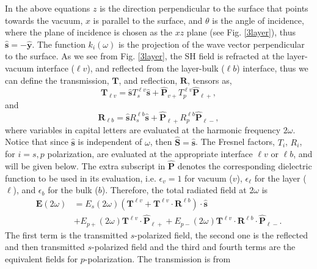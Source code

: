 \documentclass[10pt]{article}
\begin{document}
In the above equations $z$ is the direction perpendicular to the surface that
points towards the vacuum, $x$ is parallel to the surface, and $\theta$ is the
angle of incidence, where the plane of incidence is chosen as the $xz$ plane
(see Fig. \ref{3layer}), thus $\hat{\mathbf{s}}=-\hat{\mathbf{y}}$. The
function $k_i(\omega)$ is the projection of the wave vector perpendicular to
the surface. As we see from Fig. \ref{3layer}, the SH field is refracted at the
layer-vacuum interface ($\ell v$), and reflected from the layer-bulk ($\ell b$)
interface, thus we can define the transmission, $\mathbf{T}$, and reflection,
$\mathbf{R}$, tensors as,
\begin{equation*}\label{r5}
\mathbf{T}_{\ell v}
= \hat{\mathbf{s}}T_s^{\ell v}\hat{\mathbf{s}} 
+ \hat{\mathbf{P}}_{v+}T_{p}^{\ell v} \hat{\mathbf{P}}_{\ell +},
\end{equation*}
and
\begin{equation*}\label{r6}
\mathbf{R}_{\ell b}
= \hat{\mathbf{s}}R_s^{\ell b}\hat{\mathbf{s}}
+ \hat{\mathbf{P}}_{\ell +}R_{p}^{\ell b} \hat{\mathbf{P}}_{\ell -},
\end{equation*}
where variables in capital letters are evaluated at the harmonic frequency
$2\omega$. Notice that since $\hat{\mathbf{s}}$ is independent of $\omega$,
then $\hat{\mathbf{S}}=\hat{\mathbf{s}}$. The Fresnel factors, $T_i$, $R_i$,
for $i=s,p$ polarization, are evaluated at the appropriate interface $\ell v$
or $\ell b$, and will be given below. The extra subscript in $\hat{\mathbf{P}}$
denotes the corresponding dielectric function to be used in its evaluation,
i.e. $\epsilon_v=1$ for vacuum ($v$), $\epsilon_{\ell}$ for the layer ($\ell$),
and $\epsilon_{b}$ for the bulk ($b$). Therefore, the total radiated field at
$2\omega$ is
\begin{equation*}\label{r7}
\begin{split}
\mathbf{E}(2\omega)
&= E_s(2\omega)
\left(
\mathbf{T}^{\ell v} + \mathbf{T}^{\ell v}\cdot\mathbf{R}^{\ell b}
\right)
\cdot\hat{\mathbf{s}}\nonumber\\
&+ E_{p+}(2\omega)\mathbf{T}^{\ell v}\cdot\hat{\mathbf{P}}_{\ell +}
 + E_{p-}(2\omega)\mathbf{T}^{\ell v}
\cdot\mathbf{R}^{\ell b}\cdot\hat{\mathbf{P}}_{\ell-}.
\end{split}
\end{equation*}
The first term is  the transmitted $s$-polarized field, the second one is the
reflected and then transmitted $s$-polarized field and the third and fourth
terms are the equivalent fields for $p$-polarization. The transmission is from
\end{document}
